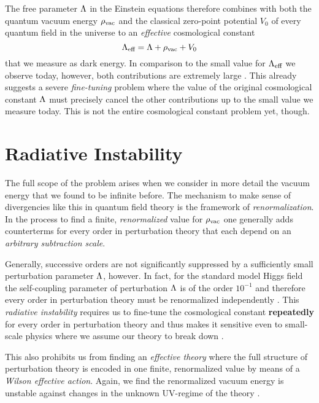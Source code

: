 \documentclass[12pt,parskip=half]{scrreprt}
\newcommand{\addref}{\todo[color=black!20]{ref.}}
\begin{document}
The free parameter \(\Lambda\) in the Einstein equations therefore combines with both the quantum vacuum energy \(\rho_\textnormal{vac}\) and the classical zero-point potential \(V_0\) of every quantum field in the universe to an \emph{effective} cosmological constant
\begin{equation}
	\Lambda_\textnormal{eff} = \Lambda + \rho_\textnormal{vac} + V_0
\end{equation}
that we measure as dark energy. In comparison to the small value for \(\Lambda_\textnormal{eff}\) we observe today, however, both contributions are extremely large \autocite{Martin2012}. \addref This already suggests a severe \emph{fine-tuning} problem where the value of the original cosmological constant \(\Lambda\) must precisely cancel the other contributions up to the small value we measure today.  This is not the entire cosmological constant problem yet, though.

\section{Radiative Instability}\label{sec:rad_instability}

The full scope of the problem arises when we consider in more detail the vacuum energy that we found to be infinite before. The mechanism to make sense of divergencies like this in quantum field theory is the framework of \emph{renormalization}. In the process to find a finite, \emph{renormalized} value for \(\rho_\textnormal{vac}\) one generally adds counterterms for every order in perturbation theory that each depend on an \emph{arbitrary subtraction scale}.

Generally, successive orders are not significantly suppressed by a sufficiently small perturbation parameter \(\Lambda\), however. In fact, for the standard model Higgs field the self-coupling parameter of perturbation \(\Lambda\) is of the order \(10^{-1}\) and therefore every order in perturbation theory must be renormalized independently \autocite{Padilla2015}. This \emph{radiative instability} requires us to fine-tune the cosmological constant \textbf{repeatedly} for every order in perturbation theory and thus makes it sensitive even to small-scale physics where we assume our theory to break down \autocite{Padilla2015}.

This also prohibits us from finding an \emph{effective theory} where the full structure of perturbation theory is encoded in one finite, renormalized value by means of a \emph{Wilson effective action}. \addref Again, we find the renormalized vacuum energy is unstable against changes in the unknown UV-regime of the theory  \autocite{Padilla2015}.
\end{document}
